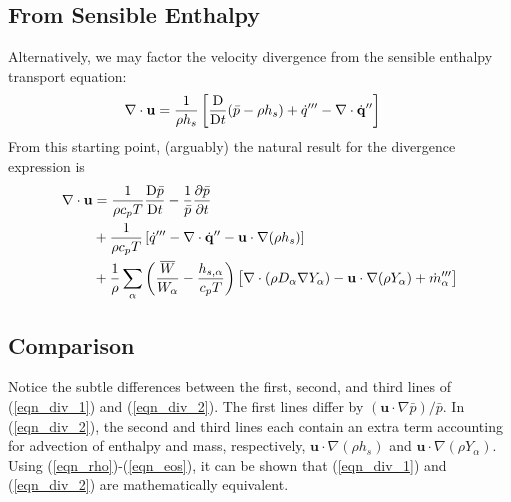 \subsection{From Sensible Enthalpy}
Alternatively, we may factor the velocity divergence from the sensible enthalpy transport equation:
\begin{align}
\label{eqn_div_new}
\nabla\cdot\mathbf{u} &= \frac{1}{\rho h_s} \left[ \frac{\mbox{D}}{\mbox{D} t}(\bar{p}-\rho h_s) + \dot{q}^{\prime\prime\prime} - \nabla\cdot \dot{\mathbf{q}}^{\prime\prime} \right]
\end{align}
From this starting point, (arguably) the natural result for the divergence expression is
\begin{align}
\label{eqn_div_2}
\nabla\cdot\mathbf{u} &= \frac{1}{\rho c_p T}\frac{\mbox{D} \bar{p}}{\mbox{D} t} - \frac{1}{\bar{p}} \frac{\partial \bar{p}}{\partial t} \notag\\
&+ \frac{1}{\rho c_p T}\left[ \dot{q}^{\prime\prime\prime} - \nabla\cdot \dot{\mathbf{q}}^{\prime\prime} - \mathbf{u} \cdot\nabla (\rho h_s) \right] \notag\\
&+ \frac{1}{\rho} \sum_\alpha \left(\frac{\overline{W}}{W_\alpha} - \frac{h_{s,\alpha}}{c_p T} \right) \big[ \nabla\cdot (\rho D_\alpha \nabla Y_\alpha) - \mathbf{u} \cdot \nabla (\rho Y_\alpha) + \dot{m}_\alpha^{\prime\prime\prime} \big]
\end{align}

\subsection{Comparison}
Notice the subtle differences between the first, second, and third lines of (\ref{eqn_div_1}) and (\ref{eqn_div_2}).  The first lines differ by $\displaystyle (\mathbf{u}\cdot\nabla \bar{p})/\bar{p}$. In (\ref{eqn_div_2}), the second and third lines each contain an extra term accounting for advection of enthalpy and mass, respectively, $\mathbf{u} \cdot\nabla (\rho h_s)$ and $\mathbf{u} \cdot \nabla (\rho Y_\alpha)$.  Using (\ref{eqn_rho})-(\ref{eqn_eos}), it can be shown that (\ref{eqn_div_1}) and (\ref{eqn_div_2}) are mathematically equivalent.




